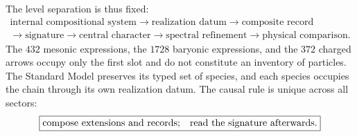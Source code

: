 The level separation is thus fixed:
\[
\boxed{
\begin{gathered}
\text{internal compositional system}
\longrightarrow\text{realization datum}
\longrightarrow\text{composite record}\\
\longrightarrow\text{signature}
\longrightarrow\text{central character}
\longrightarrow\text{spectral refinement}
\longrightarrow\text{physical comparison}.
\end{gathered}}
\]
The \(432\) mesonic expressions, the \(1728\) baryonic expressions, and the \(372\)
charged arrows occupy only the first slot and do not constitute an
inventory of particles. The Standard Model preserves its typed set of
species, and each species occupies the chain through its own realization
datum. The causal rule is unique across all sectors:
\[
 \boxed{\text{compose extensions and records;\quad read the signature afterwards}.}
\]
